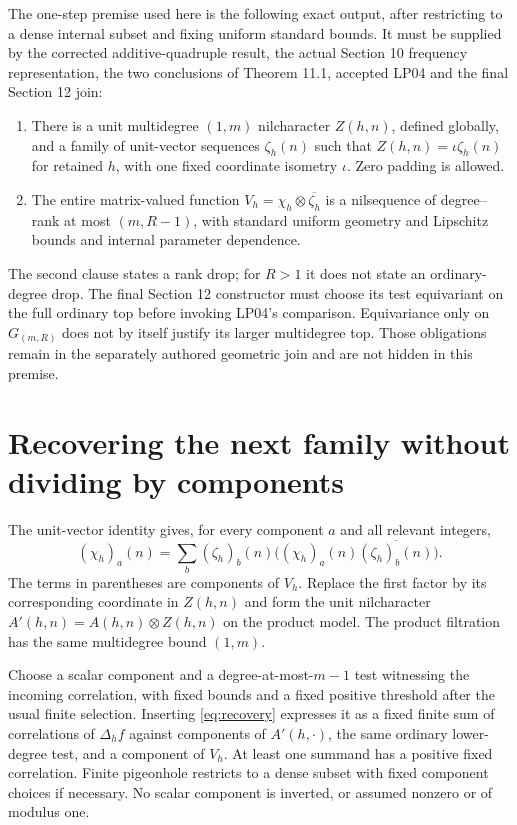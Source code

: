 \documentclass[11pt]{article}
\begin{document}
The one-step premise used here is the following exact output, after
restricting to a dense internal subset and fixing uniform standard
bounds. It must be supplied by the corrected additive-quadruple result,
the actual Section 10 frequency representation, the two conclusions of
Theorem 11.1, accepted LP04 and the final Section 12 join:
\begin{enumerate}
\item There is a unit multidegree $(1,m)$ nilcharacter $Z(h,n)$,
defined globally, and a family of unit-vector sequences $\zeta_h(n)$
such that $Z(h,n)=\iota\zeta_h(n)$ for retained $h$, with one fixed
coordinate isometry $\iota$. Zero padding is allowed.
\item The entire matrix-valued function
$V_h=\chi_h\otimes\overline{\zeta_h}$ is a nilsequence of
degree--rank at most $(m,R-1)$, with standard uniform geometry and
Lipschitz bounds and internal parameter dependence.
\end{enumerate}
The second clause states a rank drop; for $R>1$ it does not state
an ordinary-degree drop. The final Section 12 constructor must choose
its test equivariant on the full ordinary top before invoking LP04's
comparison. Equivariance only on $G_{(m,R)}$ does not by itself
justify its larger multidegree top. Those obligations remain in the
separately authored geometric join and are not hidden in this premise.

\section{Recovering the next family without dividing by components}

The unit-vector identity gives, for every component $a$ and all relevant
integers,
\begin{equation}\label{eq:recovery}
 (\chi_h)_a(n)=\sum_b (\zeta_h)_b(n)
       \bigl((\chi_h)_a(n)\overline{(\zeta_h)_b(n)}\bigr).
\end{equation}
The terms in parentheses are components of $V_h$. Replace the first
factor by its corresponding coordinate in $Z(h,n)$ and form the unit
nilcharacter $A'(h,n)=A(h,n)\otimes Z(h,n)$ on the product model.
The product filtration has the same multidegree bound $(1,m)$.

Choose a scalar component and a degree-at-most-$m-1$ test witnessing
the incoming correlation, with fixed bounds and a fixed positive
threshold after the usual finite selection. Inserting
\eqref{eq:recovery} expresses it as a fixed finite sum of correlations
of $\Delta_h f$ against components of $A'(h,\cdot)$, the same
ordinary lower-degree test, and a component of $V_h$. At least one
summand has a positive fixed correlation. Finite pigeonhole restricts
to a dense subset with fixed component choices if necessary. No scalar
component is inverted, or assumed nonzero or of modulus one.
\end{document}
